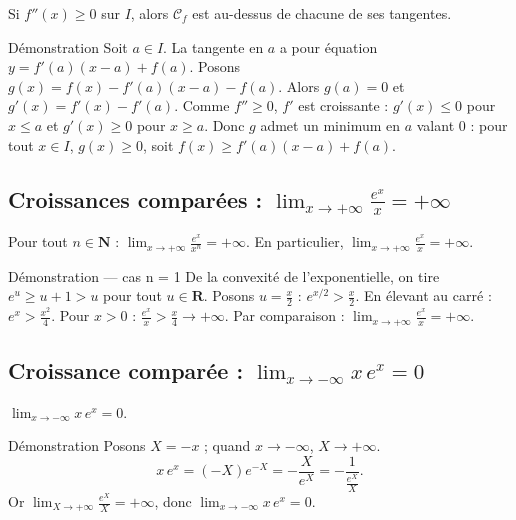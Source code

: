 \documentclass[11pt,a4paper,openany]{book}
\theoremstyle{definition}
\begin{document}
    \begin{enoncebox}
    Si $f''(x)\geq 0$ sur $I$, alors $\mathcal{C}_f$ est au-dessus de chacune de ses tangentes.
    \end{enoncebox}

    \begin{methodebox}{Démonstration}
    Soit $a\in I$. La tangente en $a$ a pour équation $y=f'(a)(x-a)+f(a)$.
    Posons $g(x)=f(x)-f'(a)(x-a)-f(a)$. Alors $g(a)=0$ et $g'(x)=f'(x)-f'(a)$.
    Comme $f''\geq 0$, $f'$ est croissante : $g'(x)\leq 0$ pour $x\leq a$ et $g'(x)\geq 0$ pour $x\geq a$.
    Donc $g$ admet un minimum en $a$ valant $0$ : pour tout $x\in I$, $g(x)\geq 0$, soit $f(x)\geq f'(a)(x-a)+f(a)$.
    \end{methodebox}

    \subsection{Croissances comparées : $\lim_{x\to+\infty}\frac{e^x}{x}=+\infty$}

    \begin{enoncebox}
    Pour tout $n\in\mathbf{N}$ : $\lim_{x\to+\infty}\frac{e^x}{x^n}=+\infty$.
    En particulier, $\lim_{x\to+\infty}\frac{e^x}{x}=+\infty$.
    \end{enoncebox}

    \begin{methodebox}{Démonstration --- cas n = 1}
    De la convexité de l'exponentielle, on tire $e^u\geq u+1>u$ pour tout $u\in\mathbf{R}$.
    Posons $u=\frac{x}{2}$ : $e^{x/2}>\frac{x}{2}$. En élevant au carré : $e^x>\frac{x^2}{4}$.
    Pour $x>0$ : $\frac{e^x}{x}>\frac{x}{4}\to+\infty$.
    Par comparaison : $\lim_{x\to+\infty}\frac{e^x}{x}=+\infty$.
    \end{methodebox}

    \subsection{Croissance comparée : $\lim_{x\to-\infty}x\,e^x=0$}

    \begin{enoncebox}
    $\lim_{x\to-\infty}x\,e^x=0$.
    \end{enoncebox}

    \begin{methodebox}{Démonstration}
    Posons $X=-x$ ; quand $x\to-\infty$, $X\to+\infty$.
    \[x\,e^x=(-X)e^{-X}=-\frac{X}{e^X}=-\frac{1}{\frac{e^X}{X}}.\]
    Or $\lim_{X\to+\infty}\frac{e^X}{X}=+\infty$, donc $\lim_{x\to-\infty}x\,e^x=0$.
    \end{methodebox}
\end{document}
